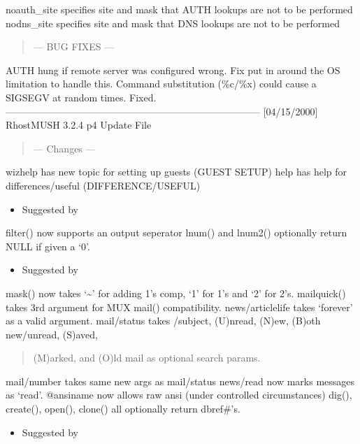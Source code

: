 \documentclass[letterpaper,10pt,english]{sphinxmanual}
\begin{document}
\sphinxAtStartPar
noauth\_site \textendash{} specifies site and mask that AUTH lookups are not to be performed
nodns\_site  \textendash{} specifies site and mask that DNS lookups are not to be performed
\begin{quote}

\sphinxAtStartPar
— BUG FIXES —
\end{quote}

\sphinxAtStartPar
AUTH hung if remote server was configured wrong.  Fix put in around the OS
limitation to handle this.
Command substitution (\%c/\%x) could cause a SIGSEGV at random times.  Fixed.
——————————————————————————\textendash{}
{[}04/15/2000{]}             RhostMUSH 3.2.4 p4 Update File
\begin{quote}

\sphinxAtStartPar
—\sphinxhyphen{} Changes —\sphinxhyphen{}
\end{quote}

\sphinxAtStartPar
wizhelp has new topic for setting up guests (GUEST SETUP)
help has help for differences/useful (DIFFERENCE/USEFUL)
\begin{itemize}
\item {} 
\sphinxAtStartPar
Suggested by 

\end{itemize}

\sphinxAtStartPar
filter() now supports an output seperator
lnum() and lnum2() optionally return NULL if given a ‘0’.
\begin{itemize}
\item {} 
\sphinxAtStartPar
Suggested by 

\end{itemize}

\sphinxAtStartPar
mask() now takes ‘\textasciitilde{}’ for adding 1’s comp, ‘1’ for 1’s and ‘2’ for 2’s.
mailquick() takes 3rd argument for MUX mail() compatibility.
news/articlelife takes ‘forever’ as a valid argument.
mail/status takes /subject, (U)nread, (N)ew, (B)oth new/unread, (S)aved,
\begin{quote}

\sphinxAtStartPar
(M)arked, and (O)ld mail as optional search params.
\end{quote}

\sphinxAtStartPar
mail/number takes same new args as mail/status
news/read now marks messages as ‘read’.
@ansiname now allows raw ansi (under controlled circumstances)
dig(), create(), open(), clone() all optionally return dbref\#’s.
\begin{itemize}
\item {} 
\sphinxAtStartPar
Suggested by 

\end{itemize}
\end{document}
